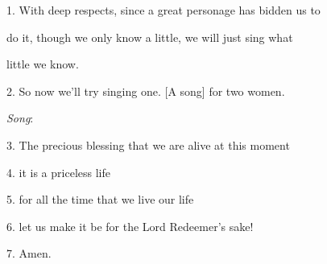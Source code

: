 \setcounter{footnote}{0}

1. With deep respects, since a great personage has bidden us to

do it, though we only know a little, we will just sing what

little we know.

2. So now we'll try singing one. [A song] for two women.

\textit{Song}:

3. The precious blessing that we are alive at this moment

4. it is a priceless life

5. for all the time that we live our life

6. let us make it be for the Lord Redeemer's sake!

7. Amen.

